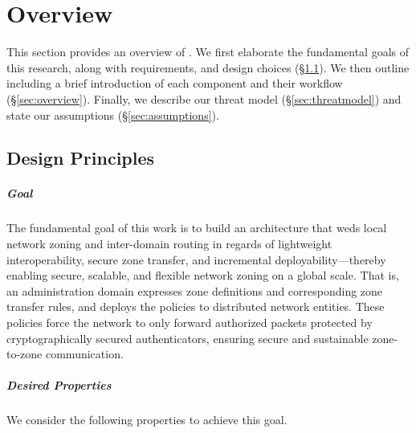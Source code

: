 \chapter{Overview}
\label{overview}

This section provides an overview of \name. We first elaborate the fundamental goals 
of this research, along with requirements, and design choices (\S\ref{sec:design}). 
We then outline \name including a brief introduction of each component and their
workflow (\S\ref{sec:overview}). Finally, we describe our threat model 
(\S\ref{sec:threatmodel}) and state our assumptions (\S\ref{sec:assumptions}).

\section{Design Principles}
\label{sec:design}

\paragraph{Goal}
The fundamental goal of this work is to build an architecture that weds local 
network zoning and inter-domain routing in regards of lightweight interoperability,
secure zone transfer, and incremental deployability---thereby enabling secure, 
scalable, and flexible network zoning on a global scale. That is, an administration 
domain expresses zone definitions and corresponding zone transfer rules, and 
deploys the policies to distributed network entities. These policies force the 
network to only forward authorized packets protected by cryptographically 
secured authenticators, ensuring secure and sustainable zone-to-zone communication.

\paragraph{Desired Properties}
We consider the following properties to achieve this goal.

